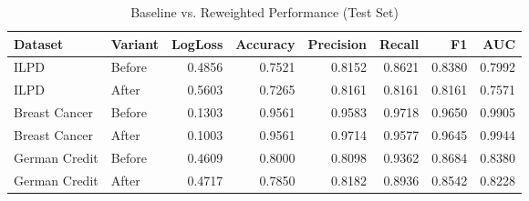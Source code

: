 \begin{table}
\caption{Baseline vs. Reweighted Performance (Test Set)}
\label{tab:perf}
\begin{tabular}{llrrrrrr}
\toprule
Dataset & Variant & LogLoss & Accuracy & Precision & Recall & F1 & AUC \\
\midrule
ILPD & Before & 0.4856 & 0.7521 & 0.8152 & 0.8621 & 0.8380 & 0.7992 \\
ILPD & After & 0.5603 & 0.7265 & 0.8161 & 0.8161 & 0.8161 & 0.7571 \\
Breast Cancer & Before & 0.1303 & 0.9561 & 0.9583 & 0.9718 & 0.9650 & 0.9905 \\
Breast Cancer & After & 0.1003 & 0.9561 & 0.9714 & 0.9577 & 0.9645 & 0.9944 \\
German Credit & Before & 0.4609 & 0.8000 & 0.8098 & 0.9362 & 0.8684 & 0.8380 \\
German Credit & After & 0.4717 & 0.7850 & 0.8182 & 0.8936 & 0.8542 & 0.8228 \\
\bottomrule
\end{tabular}
\end{table}
